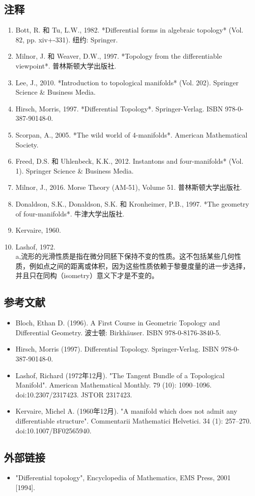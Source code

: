\subsection{注释}
\begin{enumerate}
\item Bott, R. 和 Tu, L.W., 1982. *Differential forms in algebraic topology* (Vol. 82, pp. xiv+-331). 纽约: Springer.
\item Milnor, J. 和 Weaver, D.W., 1997. *Topology from the differentiable viewpoint*. 普林斯顿大学出版社.
\item Lee, J., 2010. *Introduction to topological manifolds* (Vol. 202). Springer Science & Business Media.
\item Hirsch, Morris, 1997. *Differential Topology*. Springer-Verlag. ISBN 978-0-387-90148-0.
\item Scorpan, A., 2005. *The wild world of 4-manifolds*. American Mathematical Society.
\item Freed, D.S. 和 Uhlenbeck, K.K., 2012. Instantons and four-manifolds* (Vol. 1). Springer Science & Business Media.
\item Milnor, J., 2016. Morse Theory (AM-51), Volume 51. 普林斯顿大学出版社.
\item  Donaldson, S.K., Donaldson, S.K. 和 Kronheimer, P.B., 1997. *The geometry of four-manifolds*. 牛津大学出版社.
\item Kervaire, 1960.
\item Lashof, 1972.\\
a,流形的光滑性质是指在微分同胚下保持不变的性质。这不包括某些几何性质，例如点之间的距离或体积，因为这些性质依赖于黎曼度量的进一步选择，并且只在同构（isometry）意义下才是不变的。
\end{enumerate}
\subsection{参考文献}
\begin{itemize}
\item Bloch, Ethan D. (1996). A First Course in Geometric Topology and Differential Geometry. 波士顿: Birkhäuser. ISBN 978-0-8176-3840-5.
\item Hirsch, Morris (1997). Differential Topology. Springer-Verlag. ISBN 978-0-387-90148-0.
\item Lashof, Richard (1972年12月). "The Tangent Bundle of a Topological Manifold". American Mathematical Monthly. 79 (10): 1090–1096. doi:10.2307/2317423. JSTOR 2317423.
\item Kervaire, Michel A. (1960年12月). "A manifold which does not admit any differentiable structure". Commentarii Mathematici Helvetici. 34 (1): 257–270. doi:10.1007/BF02565940.
\end{itemize}
\subsection{外部链接}
\begin{itemize}
\item "Differential topology", Encyclopedia of Mathematics, EMS Press, 2001 [1994].
\end{itemize}
